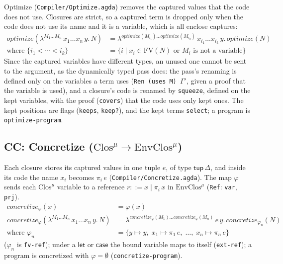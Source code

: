 \documentclass[10pt]{article}
\theoremstyle{acmplain}
\newcommand{\key}[1]{\mathsf{#1}}
\newcommand{\pass}[1]{\mathit{#1}}
\newcommand{\clos}[2]{\lambda^{#1}\, #2.\,}
\newcommand{\prj}[1]{\pi_{#1}\,}
\newcommand{\FV}{\mathrm{FV}}
\newcommand{\Ml}[1]{\textrm{#1}^{\mu}}                  %
\newcommand{\Mtup}[1]{\key{tup}\,#1}                      %
\begin{document}
Optimize (\texttt{Compiler/Optimize.agda}) removes the captured values that
the code does not use. Closures are strict, so a captured term is dropped
only when the code does not use its name and it is a variable, which is
all enclose captures:
\begin{align*}
  \pass{optimize}(\clos{M_1\ldots M_n}{x_1\ldots x_n\, y} N) &=
    \clos{\pass{optimize}(M_{i_1})\ldots \pass{optimize}(M_{i_k})}{x_{i_1}\ldots x_{i_k}\, y}
    \pass{optimize}(N) \\
  \text{where } \{ i_1 < \cdots < i_k \} &=
    \{ i \mid x_i \in \FV(N) \text{ or } M_i \text{ is not a variable} \}
\end{align*}
Since the captured variables have different types, an unused one cannot
be sent to the argument, as the dynamically typed pass does: the pass's
renaming is defined only on the variables a term uses (\texttt{Ren (uses
M) $\Gamma'$}, given a proof that the variable is used), and a closure's
code is renamed by \texttt{squeeze}, defined on the kept variables, with
the proof (\texttt{covers}) that the code uses only kept ones. The kept
positions are flags (\texttt{keeps}, \texttt{keep?}), and the kept terms
\texttt{select}; a program is \texttt{optimize-program}.

\subsection{CC: Concretize (\texorpdfstring{$\Ml{Clos} \to \Ml{EnvClos}$}{Clos-mu -> EnvClos-mu})}

Each closure stores its captured values in one tuple $e$, of type
$\Mtup{\Delta}$, and inside its code the name $x_i$ becomes $\prj{i} e$
(\texttt{Compiler/Concretize.agda}). The map $\varphi$ sends each
$\Ml{Clos}$ variable to a reference $r ::= x \mid \prj{i} x$ in
$\Ml{EnvClos}$ (\texttt{Ref}: \texttt{var}, \texttt{prj}).
\begin{align*}
  \pass{concretize}_\varphi(x) &= \varphi(x) \\
  \pass{concretize}_\varphi(\clos{M_1\ldots M_n}{x_1\ldots x_n\, y} N) &=
    \clos{\pass{concretize}_\varphi(M_1)\ldots\pass{concretize}_\varphi(M_n)}{e\,y}
       \pass{concretize}_{\varphi_n}(N) \\
  \text{where } \varphi_n &= \{ y \mapsto y,\; x_1 \mapsto \prj{1} e,\; \ldots,\; x_n \mapsto \prj{n} e \}
\end{align*}
($\varphi_n$ is \texttt{fv-ref}); under a $\key{let}$ or $\key{case}$ the
bound variable maps to itself (\texttt{ext-ref}); a program is
concretized with $\varphi = \emptyset$ (\texttt{concretize-program}).
\end{document}
